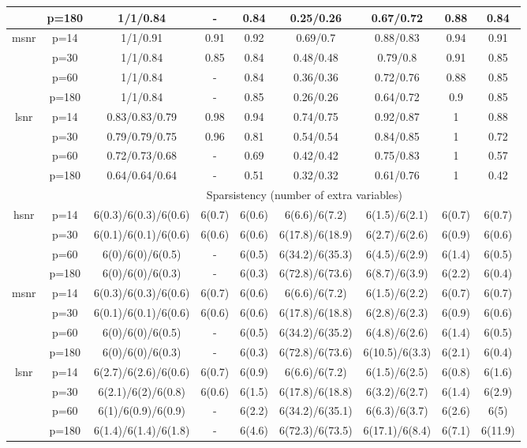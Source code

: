 \begin{table}[ht]
{\begin{tabular}{|c|c|ccccccc|}
   & p=180 & 1/1/0.84 & - & 0.84 & 0.25/0.26 & 0.67/0.72 & 0.88 & 0.84 \\ 
  \midrule\multirow{4}[2]{*}{msnr} & p=14 & 1/1/0.91 & 0.91 & 0.92 & 0.69/0.7 & 0.88/0.83 & 0.94 & 0.91 \\ 
   & p=30 & 1/1/0.84 & 0.85 & 0.84 & 0.48/0.48 & 0.79/0.8 & 0.91 & 0.85 \\ 
   & p=60 & 1/1/0.84 & - & 0.84 & 0.36/0.36 & 0.72/0.76 & 0.88 & 0.85 \\ 
   & p=180 & 1/1/0.84 & - & 0.85 & 0.26/0.26 & 0.64/0.72 & 0.9 & 0.85 \\ 
  \midrule\multirow{4}[2]{*}{lsnr} & p=14 & 0.83/0.83/0.79 & 0.98 & 0.94 & 0.74/0.75 & 0.92/0.87 & 1 & 0.88 \\ 
   & p=30 & 0.79/0.79/0.75 & 0.96 & 0.81 & 0.54/0.54 & 0.84/0.85 & 1 & 0.72 \\ 
   & p=60 & 0.72/0.73/0.68 & - & 0.69 & 0.42/0.42 & 0.75/0.83 & 1 & 0.57 \\ 
   & p=180 & 0.64/0.64/0.64 & - & 0.51 & 0.32/0.32 & 0.61/0.76 & 1 & 0.42 \\ 
   \midrule 
 \multicolumn{1}{|c}{} &       & \multicolumn{7}{c|}{Sparsistency (number of extra variables)} \\
\midrule\multirow{4}[2]{*}{hsnr} & p=14 & 6(0.3)/6(0.3)/6(0.6) & 6(0.7) & 6(0.6) & 6(6.6)/6(7.2) & 6(1.5)/6(2.1) & 6(0.7) & 6(0.7) \\ 
   & p=30 & 6(0.1)/6(0.1)/6(0.6) & 6(0.6) & 6(0.6) & 6(17.8)/6(18.9) & 6(2.7)/6(2.6) & 6(0.9) & 6(0.6) \\ 
   & p=60 & 6(0)/6(0)/6(0.5) & - & 6(0.5) & 6(34.2)/6(35.3) & 6(4.5)/6(2.9) & 6(1.4) & 6(0.5) \\ 
   & p=180 & 6(0)/6(0)/6(0.3) & - & 6(0.3) & 6(72.8)/6(73.6) & 6(8.7)/6(3.9) & 6(2.2) & 6(0.4) \\ 
  \midrule\multirow{4}[2]{*}{msnr} & p=14 & 6(0.3)/6(0.3)/6(0.6) & 6(0.7) & 6(0.6) & 6(6.6)/6(7.2) & 6(1.5)/6(2.2) & 6(0.7) & 6(0.7) \\ 
   & p=30 & 6(0.1)/6(0.1)/6(0.6) & 6(0.6) & 6(0.6) & 6(17.8)/6(18.8) & 6(2.8)/6(2.3) & 6(0.9) & 6(0.6) \\ 
   & p=60 & 6(0)/6(0)/6(0.5) & - & 6(0.5) & 6(34.2)/6(35.2) & 6(4.8)/6(2.6) & 6(1.4) & 6(0.5) \\ 
   & p=180 & 6(0)/6(0)/6(0.3) & - & 6(0.3) & 6(72.8)/6(73.6) & 6(10.5)/6(3.3) & 6(2.1) & 6(0.4) \\ 
  \midrule\multirow{4}[2]{*}{lsnr} & p=14 & 6(2.7)/6(2.6)/6(0.6) & 6(0.7) & 6(0.9) & 6(6.6)/6(7.2) & 6(1.5)/6(2.5) & 6(0.8) & 6(1.6) \\ 
   & p=30 & 6(2.1)/6(2)/6(0.8) & 6(0.6) & 6(1.5) & 6(17.8)/6(18.8) & 6(3.2)/6(2.7) & 6(1.4) & 6(2.9) \\ 
   & p=60 & 6(1)/6(0.9)/6(0.9) & - & 6(2.2) & 6(34.2)/6(35.1) & 6(6.3)/6(3.7) & 6(2.6) & 6(5) \\ 
   & p=180 & 6(1.4)/6(1.4)/6(1.8) & - & 6(4.6) & 6(72.3)/6(73.5) & 6(17.1)/6(8.4) & 6(7.1) & 6(11.9) \\ 
   \bottomrule 
\end{tabular}
}
\end{table}
